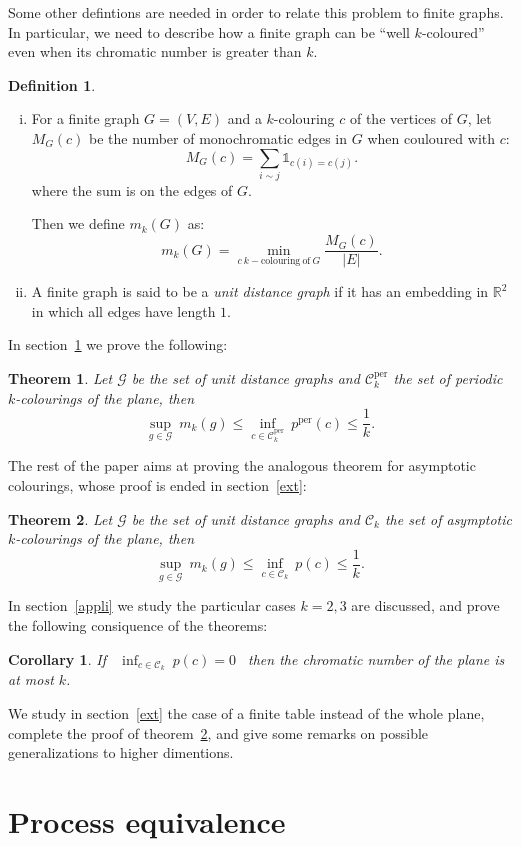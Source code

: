 \documentclass[a4paper,11pt]{article}
\newtheorem{cons}{Corollary}
\newtheorem{theo}{Theorem}
\theoremstyle{definition}
\newtheorem{definition}{Definition}
\theoremstyle{remark}
\newcommand{\R}{\mathbb{R}}
\newcommand{\C}{\mathcal{C}}
\newcommand{\pper}{p^{\mathrm{per}}}
\newcommand{\Cp}{\mathcal{C}^{\mathrm{per}}}
\newcommand{\Ca}{\mathcal{C}}
\begin{document}
Some other defintions are needed in order to relate this problem to finite
graphs. In particular, we need to describe how a finite
graph can be ``well $k$-coloured'' even when its chromatic number is greater
than $k$.
\begin{definition}
\ 
\begin{enumerate}[i)]
\item For a finite graph $G=(V,E)$ and a $k$-colouring $c$ of the vertices of $G$, 
let $M_G(c)$ be the number of monochromatic edges in $G$ when couloured with $c$:
$$M_G(c) = \sum_{i \sim j} \mathds{1}_{c(i)=c(j)}.$$
where the sum is on the edges of $G$.

Then we define $m_k(G)$ as:
\[m_k(G) = \min_{c \ k-\mathrm{colouring \ of} \ G} \frac{M_G(c)}{|E|}.\]
\item A finite graph is said to be a \emph{unit distance graph} if it has 
an embedding in $\R^2$ in which all edges have length $1$.
\end{enumerate}
\end{definition}
In section~\ref{equiv} we prove the following:
\begin{theo} \label{ineg}
Let $\mathcal{G}$ be the set of unit distance graphs and $\Cp_k$ the set 
of periodic $k$-colourings of the plane, then
$$ \sup_{g \in \mathcal{G}} \ m_k(g) \leq \inf_{c \in \Cp_k} \ \pper(c) \leq \frac{1}{k}. $$
\end{theo}
The rest of the paper aims at proving the analogous theorem for asymptotic 
colourings, whose proof is ended in section~\ref{ext}:
\begin{theo} \label{ineg2}
Let $\mathcal{G}$ be the set of unit distance graphs and $\C_k$ the set 
of asymptotic $k$-colourings of the plane, then
$$ \sup_{g \in \mathcal{G}} \ m_k(g) \leq \inf_{c \in \C_k} \ p(c) \leq \frac{1}{k}. $$
\end{theo}

In section~\ref{appli} we study the particular cases $k=2,3$ are discussed,
and prove the following consiquence of the theorems:
\begin{cons}\label{con}
If \ $\inf_{c \in \Ca_k} \ p(c) = 0$ \ then the chromatic number of the
plane is at most $k$.
\end{cons}
We study in section~\ref{ext} the case of a finite table instead of the whole plane,
complete the proof of theorem~\ref{ineg2}, and give some remarks on possible 
generalizations to higher dimentions.

\section{Process equivalence}
\label{equiv}
\end{document}
